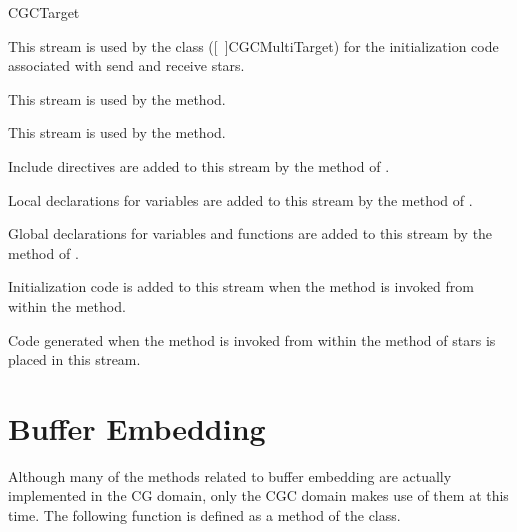 \begin{indexlist}{CGCTarget}

\begin{ifhtml}

This stream is used by the  class ([~\Ref]{CGCMultiTarget}) for the initialization code
associated with send and receive stars.

This stream is used by the
 method.

This stream is used by the
 method.

\end{ifhtml}

Include directives are added to this stream by the
 method of
.

Local declarations for variables are added to this stream by the
 method of
.

Global declarations for variables and functions are added to this
stream by the  method
of .

Initialization code is added to this stream when the
 method is invoked from
within the  method.

Code generated when the 
method is invoked from within the  method of stars is placed in this stream.

\end{indexlist}

\section{Buffer Embedding}
\label{CGC Buffer Embedding}

Although many of the methods related to buffer embedding are actually
implemented in the CG domain, only the CGC domain makes use of them at
this time.  The following function is defined as a method of the
 class.

